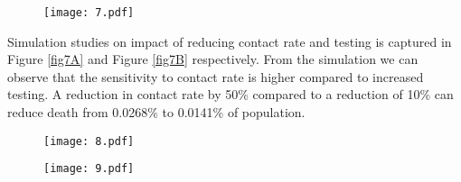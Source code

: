 \documentclass[10pt]{wlscirep}
\begin{document}
\begin{figure*}[t!]
	\centering
	\begin{subfigure}[b]{\textwidth}
		\centering
		\texttt{[image: 7.pdf]}
	\end{subfigure}
	\caption{Model simulation compared to real data (India) - Epidemic evolution predicted by the model based on the available data. Description of panels: \textbf{(a, c):} The short-term epidemic evolution obtained by reproducing the data trend with the model for 90 days, \textbf{(b, d):} Long term epidemic evolution over 700 days. Plots refers to all cases of infection, both diagnosed and non-diagnosed, predicted by the model, although non-diagnosed cases are of course not counted in the data. Note that not all panels are in the same scale.}
	\label{fig6B} 
\end{figure*}

Simulation studies on impact of reducing contact rate and testing is captured in Figure \ref{fig7A} and Figure \ref{fig7B} respectively. From the simulation we can observe that the sensitivity to contact rate is higher compared to increased testing. A reduction in contact rate by 50\% compared to a reduction of 10\% can reduce death from 0.0268\% to 0.0141\% of population.

\begin{figure*}[t!]
	\centering
	\begin{subfigure}[b]{\textwidth}
		\centering
		\texttt{[image: 8.pdf]}
	\end{subfigure}
	\caption{Sensitivity of $\beta(t)$ with $50\%, 40\%, 30\%, 20\%$ and $10\%$ reduction from current contact rate (India). Note that not all panels are in the same scale.}
	\label{fig7A} 
\end{figure*}

\begin{figure*}[t!]
	\centering
	\begin{subfigure}[b]{\textwidth}
		\centering
		\texttt{[image: 9.pdf]}
	\end{subfigure}
	\caption{Sensitivity of $\epsilon(t)$ with changed rate of testing by $1.2, 1.4, 1.6, 1.8$ and $2$ times the current rate (India). Note that not all panels are in the same scale.}
	\label{fig7B} 
\end{figure*}
\end{document}

